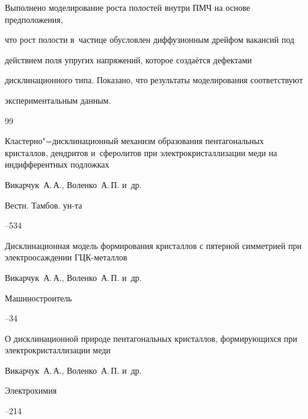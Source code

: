 Выполнено моделирование роста полостей внутри ПМЧ на основе предположения,

что рост полости в~частице обусловлен диффузионным дрейфом вакансий под

действием поля упругих напряжений,  которое создаётся дефектами

дисклинационного типа. Показано,  что результаты моделирования соответствуют

экспериментальным данным.







\begin{thebibliography}{99}


\paper Кластерно"=дисклинационный механизм образования пентагональных кристаллов,  дендритов и~сферолитов при электрокристаллизации меди на индифферентных подложках

\by Викарчук~А.\,А.,  Воленко~А.\,П. и~др.

\jour Вестн. Тамбов. ун-та




--534




\paper Дисклинационная модель формирования кристаллов с пятерной симметрией при электроосаждении ГЦК-металлов

\by Викарчук~А.\,А.,  Воленко~А.\,П. и~др.

\jour  Машиностроитель



--34




\paper  О дисклинационной природе пентагональных кристаллов,  формирующихся при электрокристаллизации меди

\by Викарчук~А.\,А.,  Воленко~А.\,П. и~др.

\jour  Электрохимия




--214





\end{thebibliography}
